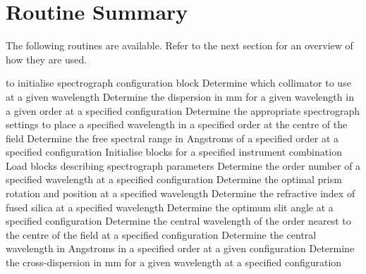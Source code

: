 \section{Routine Summary}

The following routines are available. Refer to the next section for an overview
of how they are used.

\begin{mansectionroutines}
  {} {} to initialise spectrograph configuration
                 {} block
  Determine which collimator to use at a given wavelength
  Determine the dispersion in mm for a given wavelength
                in a given order at a specified configuration
  Determine the appropriate spectrograph settings
                         to place a specified wavelength in a specified order
                         at the centre of the field
  Determine the free spectral range in Angstroms
                 of a specified order at a specified configuration
  Initialise {} blocks for a specified instrument combination
  Load {} blocks describing spectrograph parameters
  Determine the order number of a specified wavelength
                    at a specified configuration
  Determine the optimal prism rotation and position
                    at a specified wavelength
  Determine the refractive index of fused silica
                    at a specified wavelength
  Determine the optimum slit angle
                     at a specified configuration
  Determine the central wavelength of the order
                   nearest to the centre of the field at a specified
                   configuration
  Determine the central wavelength in Angstroms
                    in a specified order at a given configuration
  Determine the cross-dispersion in mm for a given wavelength
                   at a specified configuration
\end{mansectionroutines}

